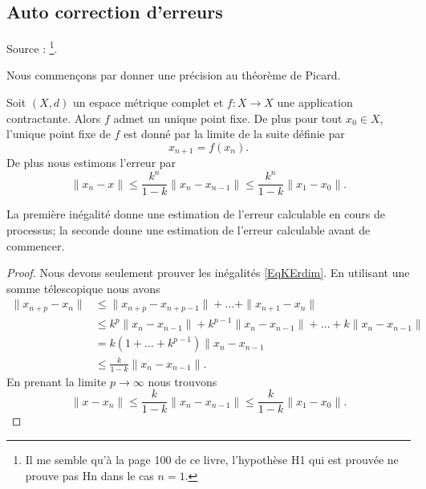 
\subsection{Auto correction d'erreurs}
\label{subseciKpMFx}

Source : \cite{NourdinAnal}\footnote{Il me semble qu'à la page 100 de ce livre, l'hypothèse H1 qui est prouvée ne prouve pas Hn dans le cas \( n=1\).}.

Nous commençons par donner une précision au théorème de Picard.
\begin{proposition}
    Soit \( (X,d)\) un espace métrique complet et \( f\colon X\to X\) une application contractante. Alors \( f\) admet un unique point fixe. De plus pour tout \( x_0\in X\), l'unique point fixe de \( f\) est donné par la limite de la suite définie par
    \begin{equation}
        x_{n+1}=f(x_n).
    \end{equation}
    De plus nous estimons l'erreur par
    \begin{equation}    \label{EqKErdim}
        \| x_n-x \|\leq \frac{ k^n }{ 1-k }\| x_n-x_{n-1} \|\leq \frac{ k^n }{ 1-k }\| x_1-x_0 \|.
    \end{equation}
\end{proposition}
La première inégalité donne une estimation de l'erreur calculable en cours de processus; la seconde donne une estimation de l'erreur calculable avant de commencer.

\begin{proof}
    Nous devons seulement prouver les inégalités \eqref{EqKErdim}. En utilisant une somme télescopique nous avons
    \begin{subequations}
        \begin{align}
            \| x_{n+p}-x_n \|&\leq \| x_{n+p}-x_{n+p-1} \|+\ldots +\| x_{n+1}-x_n \|\\
            &\leq k^p\| x_n-x_{n-1} \|+k^{p-1}\| x_n-x_{n-1} \|+\ldots +k\| x_n-x_{n-1} \|\\
            &=k(1+\ldots +k^{p-1})\| x_n-x_{n-1} \\
            &\leq \frac{ k }{ 1-k }\| x_n-x_{n-1} \|.
        \end{align}
    \end{subequations}
    En prenant la limite \( p\to \infty\) nous trouvons
    \begin{equation}        \label{EqlUMVGW}
        \| x-x_n \|\leq \frac{ k }{ 1-k }\| x_n-x_{n-1} \|\leq \frac{ k }{ 1-k }\| x_1-x_0 \|.
    \end{equation}
\end{proof}

